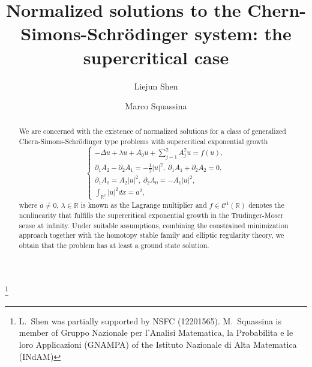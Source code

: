 \documentclass[11pt]{amsart}
\numberwithin{equation}{section}
\theoremstyle{definition}
\newcommand{\R}{\mathbb{R}}
\begin{document}
\title
[Normalized solutions for Chern-Simons-Schr\"{o}dinger systems]
{Normalized solutions to the Chern-Simons-Schr\"{o}dinger system: the
	supercritical case}

 \author[L.\ Shen]{Liejun Shen}

\author[M.\ Squassina]{Marco Squassina}


 \address{Liejun Shen, \newline\indent Department of Mathematics, Zhejiang Normal University, \newline\indent
	Jinhua, Zhejiang, 321004, People's Republic of China}

\address{Marco Squassina, \newline\indent
	Dipartimento di Matematica e Fisica \newline\indent
	Universit\`a Cattolica del Sacro Cuore, \newline\indent
	Via della Garzetta 48, 25133, Brescia, Italy}


\thanks{L.\ Shen was partially supported by NSFC (12201565). M.\  Squassina  is  member  of  Gruppo  Nazionale  per
	l'Analisi  Matematica,  la Probabilita  e  le  loro  Applicazioni  (GNAMPA)  of  the  Istituto  Nazionale  di  Alta  Matematica  (INdAM)}

\begin{abstract}
We are concerned with the existence of normalized solutions for a class of generalized Chern-Simons-Schr\"{o}dinger type problems
with supercritical exponential growth
\[
  \left\{
  \begin{array}{ll}
\displaystyle    -\Delta u +\lambda u+A_0 u+\sum\limits_{j=1}^2A_j^2 u=f(u), \\
 \displaystyle     \partial_1A_2-\partial_2A_1=-\frac{1}{2}|u|^2,~\partial_1A_1+\partial_2A_2=0,\\
 \displaystyle    \partial_1A_0=A_2|u|^2,~ \partial_2A_0=-A_1|u|^2,\\
 \displaystyle    \int_{\R^2}|u|^2dx=a^2,
  \end{array}
\right.
\]
where $a\neq0$, $\lambda\in\R$ is known as the Lagrange multiplier
and $f\in \mathcal{C}^1(\R)$ denotes the nonlinearity that fulfills the
 supercritical exponential growth in the Trudinger-Moser sense at infinity.
Under suitable assumptions, combining the constrained minimization approach together with the homotopy stable family and elliptic regularity theory,
 we obtain that the problem has at least a ground state solution.
\end{abstract}
\maketitle
\end{document}
